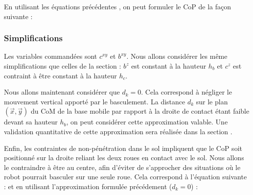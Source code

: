 				En utilisant les équations précédentes , on peut formuler le CoP de la façon suivante :	
				
			\subsubsection{Simplifications}
				
				Les variables commandées sont $c^{xy}$ et $b^{xy}$. Nous allons considérer les même simplifications que celles de la section  :
				$b^z$ est constant à la hauteur $h_b$ et $c^z$ est contraint à être constant à la hauteur $h_c$.
				
				Nous allons maintenant considérer que $d_k=0$. Cela correspond à négliger le mouvement vertical apporté par le basculement. 
				La distance $d_k$ sur le plan $(\vec{x},\vec{y})$ du CoM de la base mobile par rapport à la droite de contact étant faible devant sa hauteur $h_b$, on peut considérer cette approximation valable. 
				Une validation quantitative de cette approximation sera réalisée dans la section .
				
				Enfin, les contraintes de non-pénétration dans le sol impliquent que le CoP soit positionné sur la droite reliant les deux roues en contact avec le sol.
				Nous allons le contraindre à être au centre, afin d'éviter de s'approcher des situations où le robot pourrait basculer sur une seule roue.
				Cela correspond à l'équation suivante :
				et en utilisant l'approximation formulée précédement ($d_k=0$) :
				
